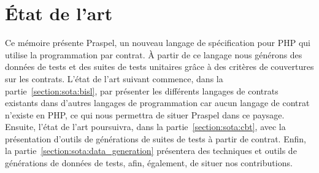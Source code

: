 \chapter{État de l'art}
\label{chapter:state}

\minitoc

Ce mémoire présente Praspel, un nouveau langage de spécification pour PHP qui
utilise la programmation par contrat. À partir de ce langage nous générons des
données de tests et des suites de tests unitaires grâce à des critères de
couvertures sur les contrats. L'état de l'art suivant commence, dans la
partie~\ref{section:sota:bisl}, par présenter les différents langages de
contrats existants dans d'autres langages de programmation car aucun langage de
contrat n'existe en PHP, ce qui nous permettra de situer Praspel dans ce
paysage. Ensuite, l'état de l'art poursuivra, dans la
partie~\ref{section:sota:cbt}, avec la présentation d'outils de générations de
suites de tests à partir de contrat. Enfin, la
partie~\ref{section:sota:data_generation} présentera des techniques et outils de
générations de données de tests, afin, également, de situer nos contributions.

